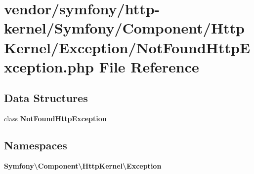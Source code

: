 \section{vendor/symfony/http-\/kernel/\+Symfony/\+Component/\+Http\+Kernel/\+Exception/\+Not\+Found\+Http\+Exception.php File Reference}
\label{_not_found_http_exception_8php}
\subsection*{Data Structures}
\begin{DoxyCompactItemize}
\item 
class {\bf Not\+Found\+Http\+Exception}
\end{DoxyCompactItemize}
\subsection*{Namespaces}
\begin{DoxyCompactItemize}
\item 
 {\bf Symfony\textbackslash{}\+Component\textbackslash{}\+Http\+Kernel\textbackslash{}\+Exception}
\end{DoxyCompactItemize}
